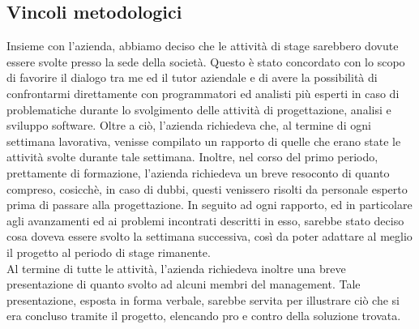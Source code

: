 \subsection{Vincoli metodologici}
Insieme con l'azienda, abbiamo deciso che le attività di stage sarebbero dovute essere svolte presso la sede della società. Questo è stato concordato con lo scopo di favorire il dialogo tra me ed il tutor aziendale e di avere la possibilità di confrontarmi direttamente con programmatori ed analisti più esperti in caso di problematiche durante lo svolgimento delle attività di progettazione, analisi e sviluppo software.
Oltre a ciò, l’azienda richiedeva che, al termine di ogni settimana lavorativa, venisse compilato un rapporto di quelle che erano state le attività svolte durante tale settimana. Inoltre, nel corso del primo periodo, prettamente di formazione, l'azienda richiedeva un breve resoconto di quanto compreso, cosicchè, in caso di dubbi, questi venissero risolti da personale esperto prima di passare alla progettazione.
In seguito ad ogni rapporto, ed in particolare agli avanzamenti ed ai problemi incontrati descritti in esso, sarebbe stato deciso cosa doveva essere svolto la settimana successiva, così da poter adattare al meglio il progetto al periodo di stage rimanente.\\
Al termine di tutte le attività, l'azienda richiedeva inoltre una breve presentazione di quanto svolto ad alcuni membri del management. Tale presentazione, esposta in forma verbale, sarebbe servita per illustrare ciò che si era concluso tramite il progetto, elencando pro e contro della soluzione trovata.
